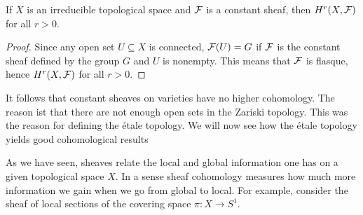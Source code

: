 \begin{theorem}
  If $X$ is an irreducible topological space and $\mathcal{F}$ is a constant sheaf, then $H^r(X, \mathcal{F})$ for all $r>0$.
\end{theorem}
\begin{proof}
  Since any open set $U \subseteq X$ is connected, $\mathcal{F}(U) = G$ if $\mathcal{F}$ is the constant sheaf defined by the group $G$ and $U$ is nonempty. This means that $\mathcal{F}$ is flasque, hence $H^r(X, \mathcal{F})$ for all $r>0$.
\end{proof}
It follows that constant sheaves on varieties have no higher cohomology. The reason ist that there are not enough open sets in the Zariski topology. This was the reason for defining the \'etale topology. We will now see how the \'etale topology yields good cohomological results

As we have seen, sheaves relate the local and global information one has on a given topological space $X$. In a sense sheaf cohomology measures how much more information we gain when we go from global to local. For example, consider the sheaf of local sections of the covering space $\pi : X \to S^1$.
%
%
%
